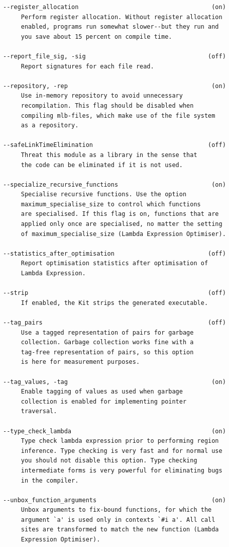 \documentclass[12pt]{book}
\begin{document}
\begin{verbatim}
--register_allocation                                     (on)
     Perform register allocation. Without register allocation
     enabled, programs run somewhat slower--but they run and
     you save about 15 percent on compile time.

--report_file_sig, -sig                                  (off)
     Report signatures for each file read.

--repository, -rep                                        (on)
     Use in-memory repository to avoid unnecessary
     recompilation. This flag should be disabled when
     compiling mlb-files, which make use of the file system
     as a repository.

--safeLinkTimeElimination                                (off)
     Threat this module as a library in the sense that
     the code can be eliminated if it is not used.

--specialize_recursive_functions                          (on)
     Specialise recursive functions. Use the option
     maximum_specialise_size to control which functions
     are specialised. If this flag is on, functions that are
     applied only once are specialised, no matter the setting
     of maximum_specialise_size (Lambda Expression Optimiser).

--statistics_after_optimisation                          (off)
     Report optimisation statistics after optimisation of
     Lambda Expression.

--strip                                                  (off)
     If enabled, the Kit strips the generated executable.

--tag_pairs                                              (off)
     Use a tagged representation of pairs for garbage
     collection. Garbage collection works fine with a
     tag-free representation of pairs, so this option
     is here for measurement purposes.

--tag_values, -tag                                        (on)
     Enable tagging of values as used when garbage
     collection is enabled for implementing pointer
     traversal.

--type_check_lambda                                       (on)
     Type check lambda expression prior to performing region
     inference. Type checking is very fast and for normal use
     you should not disable this option. Type checking
     intermediate forms is very powerful for eliminating bugs
     in the compiler.

--unbox_function_arguments                                (on)
     Unbox arguments to fix-bound functions, for which the
     argument `a' is used only in contexts `#i a'. All call 
     sites are transformed to match the new function (Lambda
     Expression Optimiser).


\end{verbatim}
\end{document}
